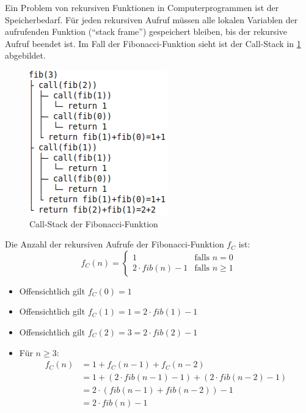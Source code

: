 Ein Problem von rekursiven Funktionen in Computerprogrammen ist der 
Speicherbedarf. Für jeden rekursiven Aufruf müssen alle lokalen Variablen
der aufrufenden Funktion (\enquote{stack frame}) gespeichert bleiben,
bis der rekursive Aufruf beendet ist. Im Fall der Fibonacci-Funktion
sieht ist der Call-Stack in \cref{fig:fib-callstack} abgebildet.

\begin{figure}[htp]
    \centering
    \includegraphics*[width=0.5\linewidth, keepaspectratio]{figures/fib-callstack.png} 
    \caption{Call-Stack der Fibonacci-Funktion}
    \label{fig:fib-callstack}
\end{figure}

\begin{bemerkung}
    Die Anzahl der rekursiven Aufrufe der Fibonacci-Funktion $f_C$ ist:
        \[f_C(n) = \begin{cases}
                        1 &\text{falls } n=0\\
                    2 \cdot fib(n) - 1 &\text{falls } n \geq 1
                    \end{cases}\]
\end{bemerkung}
\begin{beweis}\leavevmode
    \begin{itemize}
        \item Offensichtlich gilt $f_C(0) = 1$
        \item Offensichtlich gilt $f_C(1) = 1 = 2 \cdot fib(1) - 1$
        \item Offensichtlich gilt $f_C(2) = 3 = 2 \cdot fib(2) - 1$
        \item Für $n \geq 3$:
           \begin{align*}
                f_C(n) &= 1 + f_C(n-1) + f_C(n-2)\\
                       &= 1 + (2\cdot fib(n-1)-1) + (2 \cdot fib(n-2)-1)\\
                       &=2\cdot (fib(n-1) + fib(n-2)) - 1\\
                       &=2 \cdot fib(n) - 1
            \end{align*}
    \end{itemize}
\end{beweis}

